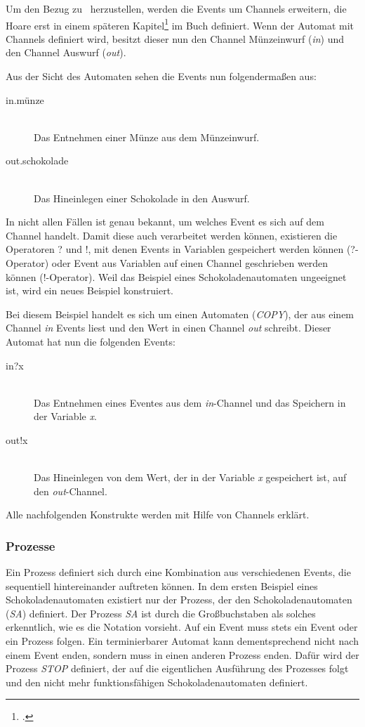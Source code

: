 Um den Bezug zu \CA\ herzustellen, werden die Events um Channels erweitern, die Hoare erst in einem späteren Kapitel\footcite[Kap. 4.2]{CSPBOOK} im Buch definiert.
Wenn der Automat mit Channels definiert wird, besitzt dieser nun den Channel Münzeinwurf (\textit{in}) und den Channel Auswurf (\textit{out}).

Aus der Sicht des Automaten sehen die Events nun folgendermaßen aus:

\begin{description}
\item[in.münze]\hfill \\
Das Entnehmen einer Münze aus dem Münzeinwurf.
\item[out.schokolade]\hfill \\
Das Hineinlegen einer Schokolade in den Auswurf.
\end{description}

In nicht allen Fällen ist genau bekannt, um welches Event es sich auf dem Channel handelt. Damit diese auch verarbeitet werden können, existieren die Operatoren ? und !, mit denen Events in Variablen gespeichert werden können (?-Operator) oder Event aus Variablen auf einen Channel geschrieben werden können (!-Operator). Weil das Beispiel eines Schokoladenautomaten ungeeignet ist, wird ein neues Beispiel konstruiert. 

Bei diesem Beispiel handelt es sich um einen Automaten (\textit{COPY}), der aus einem Channel \textit{in} Events liest und den Wert in einen Channel \textit{out} schreibt. Dieser Automat hat nun die folgenden Events:

\begin{description}
\item[in?x]\hfill \\
Das Entnehmen eines Eventes aus dem \textit{in}-Channel und das Speichern in der Variable \textit{x}.
\item[out!x]\hfill \\
Das Hineinlegen von dem Wert, der in der Variable \textit{x} gespeichert ist, auf den \textit{out}-Channel.
\end{description}

Alle nachfolgenden Konstrukte werden mit Hilfe von Channels erklärt.

\subsubsection{Prozesse}
Ein Prozess definiert sich durch eine Kombination aus verschiedenen Events, die sequentiell hintereinander auftreten können. In dem ersten Beispiel eines Schokoladenautomaten existiert nur der Prozess, der den  Schokoladenautomaten (\textit{SA}) definiert. Der Prozess \textit{SA} ist durch die Großbuchstaben als solches erkenntlich, wie es die Notation vorsieht. Auf ein Event muss stets ein Event oder ein Prozess folgen. Ein terminierbarer Automat kann dementsprechend nicht nach einem Event enden, sondern muss in einen anderen Prozess enden. Dafür wird der Prozess \textit{STOP} definiert, der auf die eigentlichen Ausführung des Prozesses folgt und den nicht mehr funktionsfähigen Schokoladenautomaten definiert.


